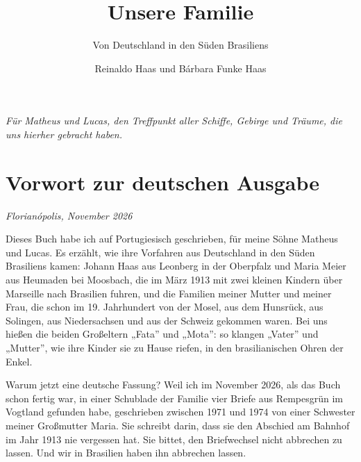 \documentclass[
  ngerman,
  11pt,
  openany]{book}
\title{Unsere Familie}
\subtitle{Von Deutschland in den Süden Brasiliens}
\author{Reinaldo Haas und Bárbara Funke Haas}
\date{}
\begin{document}
\frontmatter
\maketitle

\frontmatter
\thispagestyle{empty}\vspace*{0.3\textheight}
\begin{flushright}\itshape Für Matheus und Lucas, den Treffpunkt aller Schiffe, Gebirge und Träume, die uns hierher gebracht haben.\end{flushright}
\cleardoublepage\tableofcontents
\cleardoublepage\listoffigures
\mainmatter

\mainmatter
\chapter*{Vorwort zur deutschen Ausgabe}\label{vorwort}

\emph{Florianópolis, November 2026}

Dieses Buch habe ich auf Portugiesisch geschrieben, für meine Söhne
Matheus und Lucas. Es erzählt, wie ihre Vorfahren aus Deutschland in den
Süden Brasiliens kamen: Johann Haas aus Leonberg in der Oberpfalz und
Maria Meier aus Heumaden bei Moosbach, die im März 1913 mit zwei kleinen
Kindern über Marseille nach Brasilien fuhren, und die Familien meiner
Mutter und meiner Frau, die schon im 19. Jahrhundert von der Mosel, aus
dem Hunsrück, aus Solingen, aus Niedersachsen und aus der Schweiz
gekommen waren. Bei uns hießen die beiden Großeltern „Fata'' und
„Mota'': so klangen „Vater'' und „Mutter'', wie ihre Kinder sie zu Hause
riefen, in den brasilianischen Ohren der Enkel.

Warum jetzt eine deutsche Fassung? Weil ich im November 2026, als das
Buch schon fertig war, in einer Schublade der Familie vier Briefe aus
Rempesgrün im Vogtland gefunden habe, geschrieben zwischen 1971 und 1974
von einer Schwester meiner Großmutter Maria. Sie schreibt darin, dass
sie den Abschied am Bahnhof im Jahr 1913 nie vergessen hat. Sie bittet,
den Briefwechsel nicht abbrechen zu lassen. Und wir in Brasilien haben
ihn abbrechen lassen.
\end{document}
